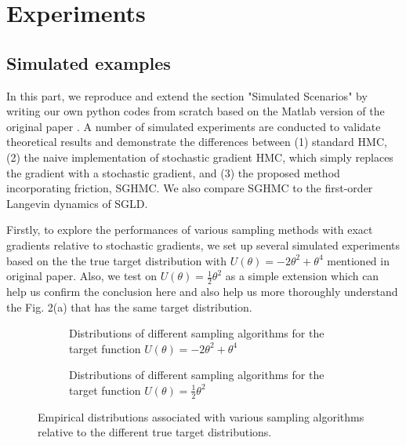 
\section{Experiments}

\subsection{Simulated examples}
In this part, we reproduce and extend the section "Simulated Scenarios" by writing our own python codes from scratch based on the Matlab version of the original paper \cite{simu_code}. A number of simulated experiments are conducted to validate theoretical results and demonstrate the differences between (1) standard HMC, (2) the naive implementation of stochastic gradient HMC, which simply replaces the gradient with a stochastic gradient, and (3) the proposed method incorporating friction, SGHMC. We also compare SGHMC to the first-order Langevin dynamics of SGLD.

Firstly, to explore the performances of various sampling methods with exact gradients relative to stochastic gradients, we set up several simulated experiments based on the the true target distribution with $U(\theta) = -2\theta^2 + \theta^4$ mentioned in original paper. Also, we test on $U(\theta) = \frac{1}{2}\theta^2$ as a simple extension which can help us confirm the conclusion here and also help us more thoroughly understand the Fig. 2(a) that has the same target distribution. 

\begin{figure}
\begin{subfigure}{\textwidth}

\caption{Distributions of different sampling algorithms for the target function $U(\theta) = -2\theta^2 + \theta^4$}
\label{fig1a}
\end{subfigure}%

\begin{subfigure}{\textwidth}

\caption{Distributions of different sampling algorithms for the target function $U(\theta) = \frac{1}{2}\theta^2$}
\label{fig1b}
\end{subfigure}
\caption{Empirical distributions associated with various sampling algorithms relative to the different true target distributions.}
\label{fig:demo}
\end{figure}


